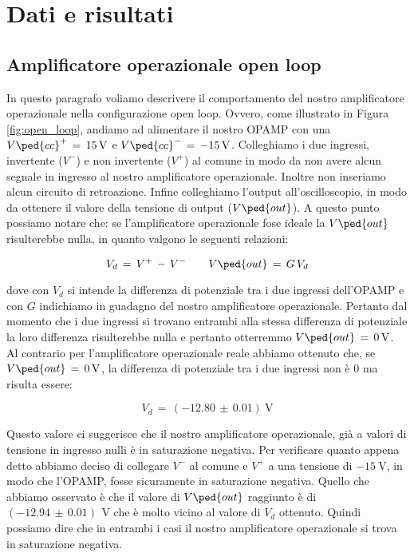 \section*{Dati e risultati}

\subsection*{Amplificatore operazionale open loop}

In questo paragrafo voliamo descrivere il comportamento del nostro amplificatore operazionale nella configurazione open loop. Ovvero, come illustrato in Figura \ref{fig:open_loop}, andiamo ad alimentare il nostro OPAMP con una $V\ped{cc}^+\,=\,\SI{+15}{\volt}$ e $V\ped{cc}^-\,=\,\SI{-15}{\volt}$. Colleghiamo i due ingressi, invertente ($V^-$) e non invertente ($V^+$) al comune in modo da non avere alcun segnale in ingresso al nostro amplificatore operazionale. Inoltre non inseriamo alcun circuito di retroazione. Infine colleghiamo l'output all'oscilloscopio, in modo da ottenere il valore della tensione di output ($V\ped{out}$).
A questo punto possiamo notare che: se l'amplificatore operazionale fose ideale la $V\ped{out}$ risulterebbe nulla, in quanto valgono le seguenti relazioni:

\begin{equation}
	V_d\,=\,V^+\,-\,V^- \qquad V\ped{out}\,=\,G\,V_d
\end{equation}

dove con $V_d$ si intende la differenza di potenziale tra i due ingressi dell'OPAMP e con $G$ indichiamo in guadagno del nostro amplificatore operazionale. Pertanto dal momento che i due ingressi si trovano entrambi alla stessa differenza di potenziale la loro differenza risulterebbe nulla e pertanto otterremmo $V\ped{out}\,=\,\SI{0}{\volt}$.
Al contrario per l'amplificatore operazionale reale abbiamo ottenuto che, se $V\ped{out}\,=\,\SI{0}{\volt}$, la differenza di potenziale tra i due ingressi non è 0 ma risulta essere:

\begin{equation}
	V_d\,=\,(-12.80\,\pm\,0.01) \SI{}{\volt}
\end{equation}

Questo valore ci suggerisce che il nostro amplificatore operazionale, già a valori di tensione in ingresso nulli è in saturazione negativa. Per verificare quanto appena detto abbiamo deciso di collegare $V^-$ al comune e $V^+$ a una tensione di $\SI{-15}{\volt}$, in modo che l'OPAMP, fosse sicuramente in saturazione negativa. Quello che abbiamo osservato è che il valore di $V\ped{out}$ raggiunto è di $(-12.94\,\pm\,0.01)\,\SI{}{\volt}$ che è molto vicino al valore di $V_d$ ottenuto. Quindi possiamo dire che in entrambi i casi il nostro amplificatore operazionale si trova in saturazione negativa.

